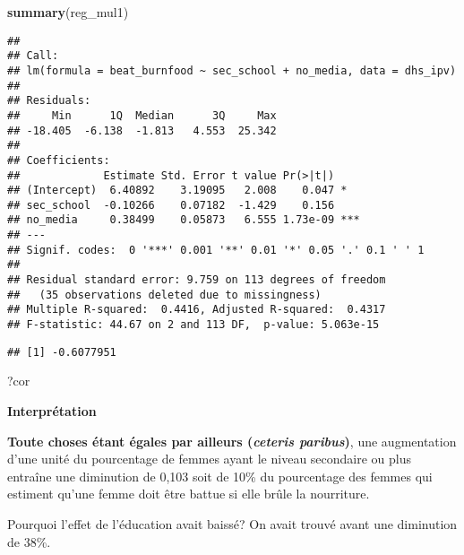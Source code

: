 \documentclass[
]{article}
\newenvironment{Shaded}{\begin{snugshade}}{\end{snugshade}}
\newcommand{\DataTypeTok}[1]{\textcolor[rgb]{0.13,0.29,0.53}{#1}}
\newcommand{\KeywordTok}[1]{\textcolor[rgb]{0.13,0.29,0.53}{\textbf{#1}}}
\newcommand{\NormalTok}[1]{#1}
\newcommand{\OperatorTok}[1]{\textcolor[rgb]{0.81,0.36,0.00}{\textbf{#1}}}
\newcommand{\StringTok}[1]{\textcolor[rgb]{0.31,0.60,0.02}{#1}}
\begin{document}
\begin{Shaded}
\begin{Highlighting}[]
\KeywordTok{summary}\NormalTok{(reg_mul1)}
\end{Highlighting}
\end{Shaded}

\begin{verbatim}
## 
## Call:
## lm(formula = beat_burnfood ~ sec_school + no_media, data = dhs_ipv)
## 
## Residuals:
##     Min      1Q  Median      3Q     Max 
## -18.405  -6.138  -1.813   4.553  25.342 
## 
## Coefficients:
##             Estimate Std. Error t value Pr(>|t|)    
## (Intercept)  6.40892    3.19095   2.008    0.047 *  
## sec_school  -0.10266    0.07182  -1.429    0.156    
## no_media     0.38499    0.05873   6.555 1.73e-09 ***
## ---
## Signif. codes:  0 '***' 0.001 '**' 0.01 '*' 0.05 '.' 0.1 ' ' 1
## 
## Residual standard error: 9.759 on 113 degrees of freedom
##   (35 observations deleted due to missingness)
## Multiple R-squared:  0.4416, Adjusted R-squared:  0.4317 
## F-statistic: 44.67 on 2 and 113 DF,  p-value: 5.063e-15
\end{verbatim}

\begin{Shaded}
\end{Shaded}

\begin{verbatim}
## [1] -0.6077951
\end{verbatim}

\begin{Shaded}
\begin{Highlighting}[]
\NormalTok{?cor}
\end{Highlighting}
\end{Shaded}

\textbf{Interprétation}

\textbf{Toute choses étant égales par ailleurs (\emph{ceteris
paribus})}, une augmentation d'une unité du pourcentage de femmes ayant
le niveau secondaire ou plus entraîne une diminution de 0,103 soit de
10\% du pourcentage des femmes qui estiment qu'une femme doit être
battue si elle brûle la nourriture.

Pourquoi l'effet de l'éducation avait baissé? On avait trouvé avant une
diminution de 38\%.
\end{document}
